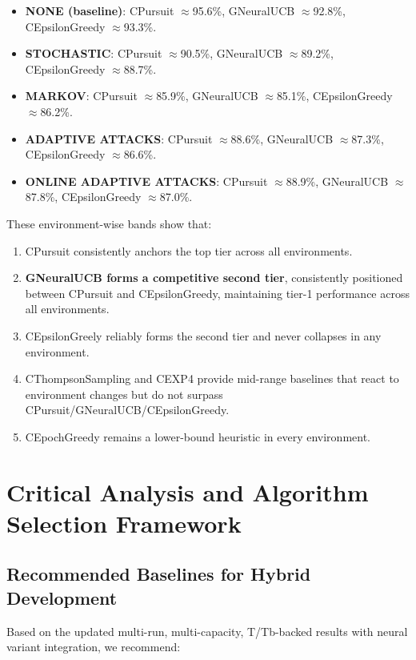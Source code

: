 \documentclass[12pt,a4paper]{article}
\newcommand{\neural}[1]{\textcolor{neuralcolor}{\textbf{#1}}}
\begin{document}
\begin{itemize}
\item \textbf{NONE (baseline)}: CPursuit $\approx$95.6\%, GNeuralUCB $\approx$92.8\%, CEpsilonGreedy $\approx$93.3\%.
\item \textbf{STOCHASTIC}: CPursuit $\approx$90.5\%, GNeuralUCB $\approx$89.2\%, CEpsilonGreedy $\approx$88.7\%.
\item \textbf{MARKOV}: CPursuit $\approx$85.9\%, GNeuralUCB $\approx$85.1\%, CEpsilonGreedy $\approx$86.2\%.
\item \textbf{ADAPTIVE ATTACKS}: CPursuit $\approx$88.6\%, GNeuralUCB $\approx$87.3\%, CEpsilonGreedy $\approx$86.6\%.
\item \textbf{ONLINE ADAPTIVE ATTACKS}: CPursuit $\approx$88.9\%, GNeuralUCB $\approx$87.8\%, CEpsilonGreedy $\approx$87.0\%.
\end{itemize}

These environment-wise bands show that:

\begin{enumerate}
\item CPursuit consistently anchors the top tier across all environments.
\item \neural{GNeuralUCB forms a competitive second tier}, consistently positioned between CPursuit and CEpsilonGreedy, maintaining tier-1 performance across all environments.
\item CEpsilonGreely reliably forms the second tier and never collapses in any environment.
\item CThompsonSampling and CEXP4 provide mid-range baselines that react to environment changes but do not surpass CPursuit/GNeuralUCB/CEpsilonGreedy.
\item CEpochGreedy remains a lower-bound heuristic in every environment.
\end{enumerate}

\newpage
\section{Critical Analysis and Algorithm Selection Framework}

\subsection{Recommended Baselines for Hybrid Development}

Based on the updated multi-run, multi-capacity, T/Tb-backed results with neural variant integration, we recommend:
\end{document}
